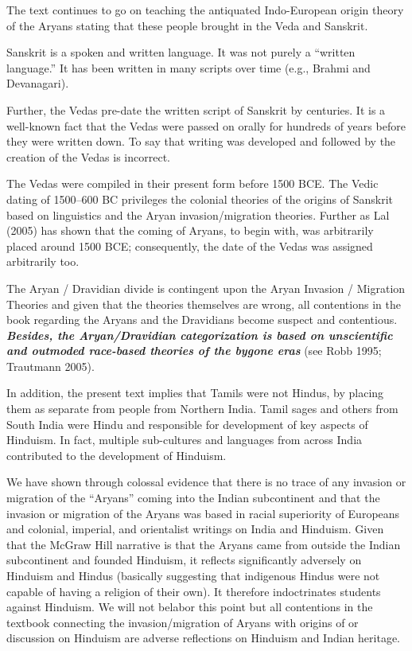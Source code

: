 The text continues to go on teaching the antiquated Indo-European origin theory of the Aryans stating that these people brought in the Veda and Sanskrit. 

Sanskrit is a spoken and written language. It was not purely a “written language.” It has been written in many scripts over time (e.g., Brahmi and Devanagari). 

Further, the Vedas pre-date the written script of Sanskrit by centuries. It is a well-known fact that the Vedas were passed on orally for hundreds of years before they were written down. To say that writing was developed and followed by the creation of the Vedas is incorrect.

The Vedas were compiled in their present form before 1500 BCE. The Vedic dating of 1500--600 BC privileges the colonial theories of the origins of Sanskrit based on linguistics and the Aryan invasion/migration theories. Further as Lal (2005) has shown that the coming of Aryans, to begin with, was arbitrarily placed around 1500 BCE; consequently, the date of the Vedas was assigned arbitrarily too.

The Aryan / Dravidian divide is contingent upon the Aryan Invasion / Migration Theories and given that the theories themselves are wrong, all contentions in the book regarding the Aryans and the Dravidians become suspect and contentious. \textit{\textbf{Besides, the Aryan/Dravidian categorization is based on unscientific and outmoded race-based theories of the bygone eras}} (see Robb 1995; Trautmann 2005). 

In addition, the present text implies that Tamils were not Hindus, by placing them as separate from people from Northern India. Tamil sages and others from South India were Hindu and responsible for development of key aspects of Hinduism. In fact, multiple sub-cultures and languages from across India contributed to the development of Hinduism.

We have shown through colossal evidence that there is no trace of any invasion or migration of the “Aryans” coming into the Indian subcontinent and that the invasion or migration of the Aryans was based in racial superiority of Europeans and colonial, imperial, and orientalist writings on India and Hinduism. Given that the McGraw Hill narrative is that the Aryans came from outside the Indian subcontinent and founded Hinduism, it reflects significantly adversely on Hinduism and Hindus (basically suggesting that indigenous Hindus were not capable of having a religion of their own). It therefore indoctrinates students against Hinduism. We will not belabor this point but all contentions in the textbook connecting the invasion/migration of Aryans with origins of or discussion on Hinduism are adverse reflections on Hinduism and Indian heritage.

